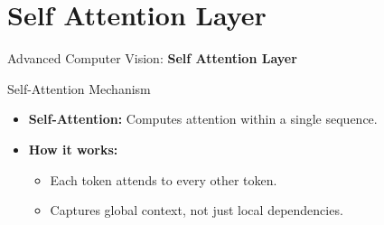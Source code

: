 \section{Self Attention Layer}
\begin{frame}{}
    \LARGE Advanced Computer Vision: \textbf{Self Attention Layer}
\end{frame}

\begin{frame}{Self-Attention Mechanism}
    \begin{itemize}
        \item \textbf{Self-Attention:} Computes attention within a single sequence.
        \item \textbf{How it works:}
        \begin{itemize}
            \item Each token attends to every other token.
            \item Captures global context, not just local dependencies.
        \end{itemize}
    \end{itemize}
\end{frame}

